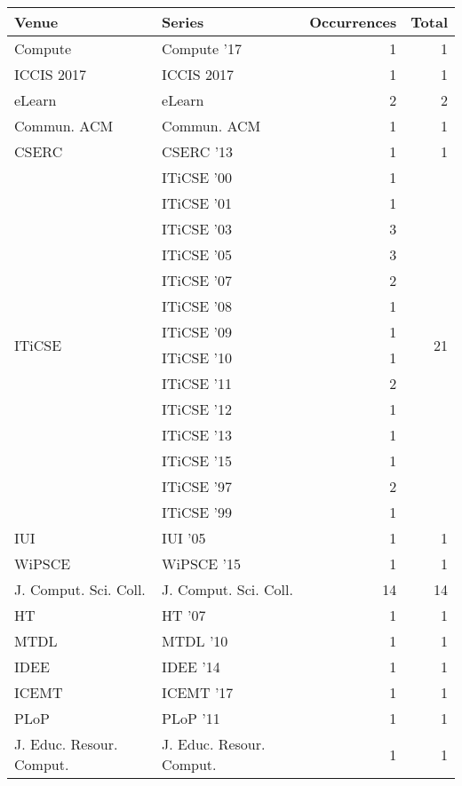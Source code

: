 \begin{table*}[t]
\begin{tabular}{llrr}
Venue & Series & Occurrences & Total\\\hline
\multirow{1}{*}{Compute } & Compute '17 & 1 & \multirow{1}{*}{1}\\
\multirow{1}{*}{ICCIS 2017} & ICCIS 2017 & 1 & \multirow{1}{*}{1}\\
\multirow{1}{*}{eLearn} & eLearn & 2 & \multirow{1}{*}{2}\\
\multirow{1}{*}{Commun. ACM} & Commun. ACM & 1 & \multirow{1}{*}{1}\\
\multirow{1}{*}{CSERC } & CSERC '13 & 1 & \multirow{1}{*}{1}\\
\multirow{14}{*}{ITiCSE } & ITiCSE '00 & 1 & \multirow{14}{*}{21}\\
& ITiCSE '01 & 1 &\\
& ITiCSE '03 & 3 &\\
& ITiCSE '05 & 3 &\\
& ITiCSE '07 & 2 &\\
& ITiCSE '08 & 1 &\\
& ITiCSE '09 & 1 &\\
& ITiCSE '10 & 1 &\\
& ITiCSE '11 & 2 &\\
& ITiCSE '12 & 1 &\\
& ITiCSE '13 & 1 &\\
& ITiCSE '15 & 1 &\\
& ITiCSE '97 & 2 &\\
& ITiCSE '99 & 1 &\\
\multirow{1}{*}{IUI } & IUI '05 & 1 & \multirow{1}{*}{1}\\
\multirow{1}{*}{WiPSCE } & WiPSCE '15 & 1 & \multirow{1}{*}{1}\\
\multirow{1}{*}{J. Comput. Sci. Coll.} & J. Comput. Sci. Coll. & 14 & \multirow{1}{*}{14}\\
\multirow{1}{*}{HT } & HT '07 & 1 & \multirow{1}{*}{1}\\
\multirow{1}{*}{MTDL } & MTDL '10 & 1 & \multirow{1}{*}{1}\\
\multirow{1}{*}{IDEE } & IDEE '14 & 1 & \multirow{1}{*}{1}\\
\multirow{1}{*}{ICEMT } & ICEMT '17 & 1 & \multirow{1}{*}{1}\\
\multirow{1}{*}{PLoP } & PLoP '11 & 1 & \multirow{1}{*}{1}\\
\multirow{1}{*}{J. Educ. Resour. Comput.} & J. Educ. Resour. Comput. & 1 & \multirow{1}{*}{1}\\

\end{tabular}
\end{table*}
